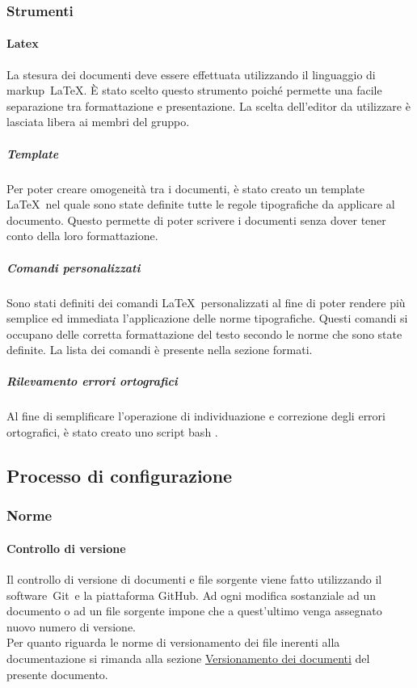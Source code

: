 \documentclass[../NormeProgetto.tex]{subfiles}
\begin{document}
	\subsubsection{Strumenti}
		\paragraph{Latex}
		La stesura dei documenti deve essere effettuata utilizzando il linguaggio di markup\g\ \LaTeX\g. È stato scelto questo strumento poiché permette una facile separazione tra formattazione e presentazione. La scelta dell'editor da utilizzare è lasciata libera ai membri del gruppo.
		
			\subparagraph{Template}
			Per poter creare omogeneità tra i documenti, è stato creato un template \LaTeX\g\ nel quale sono state definite tutte le regole tipografiche da applicare al documento. Questo permette di poter scrivere i documenti senza dover tener conto della loro formattazione.
			\subparagraph{Comandi personalizzati}
			Sono stati definiti dei comandi \LaTeX\g\ personalizzati al fine di poter rendere più semplice ed immediata l'applicazione delle norme tipografiche. Questi comandi si occupano delle corretta formattazione del testo secondo le norme che sono state definite. La lista dei comandi è presente nella sezione formati.
			\subparagraph{Rilevamento errori ortografici}
			Al fine di semplificare l'operazione di individuazione e correzione degli errori ortografici, è stato creato uno script bash .

\subsection{Processo di configurazione}
	\subsubsection{Norme}
	\paragraph{Controllo di versione}

	Il controllo di versione di documenti e file sorgente viene fatto utilizzando il software\g\ Git\g\ e la piattaforma GitHub\g. Ad ogni modifica sostanziale ad un documento o ad un file sorgente impone che a quest'ultimo venga assegnato nuovo numero di versione. \\ Per quanto riguarda le norme di versionamento dei file inerenti alla documentazione si rimanda alla sezione \hyperref[sec:Versionamento dei documenti]{Versionamento dei documenti} del presente documento.
\end{document}
